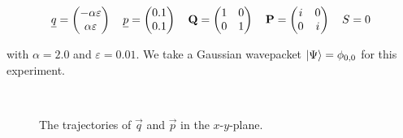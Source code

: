 \begin{align*}
  \underline{q} = \begin{pmatrix}
              -\alpha \varepsilon \\ \alpha \varepsilon
            \end{pmatrix}
  \quad
  \underline{p} = \begin{pmatrix}
              0.1 \\ 0.1
            \end{pmatrix}
  \quad
  \mathbf{Q} = \begin{pmatrix}
              1 & 0 \\ 0 & 1
            \end{pmatrix}
  \quad
  \mathbf{P} = \begin{pmatrix}
              i & 0 \\ 0 & i
            \end{pmatrix}
  \quad
  S = 0
\end{align*}

with $\alpha = 2.0$ and $\varepsilon=0.01$. We take a Gaussian wavepacket $\Ket{\Psi} = \phi_{0,0}$
for this experiment.

\begin{figure}[ht!]
  \centering
   \\
  \caption[Trajectories of position and momentum for a special setting]{
    The trajectories of $\vec{q}$ and $\vec{p}$ in the $x$-$y$-plane.
    \label{fig:conic_circle_trajectories}
  }
\end{figure}


